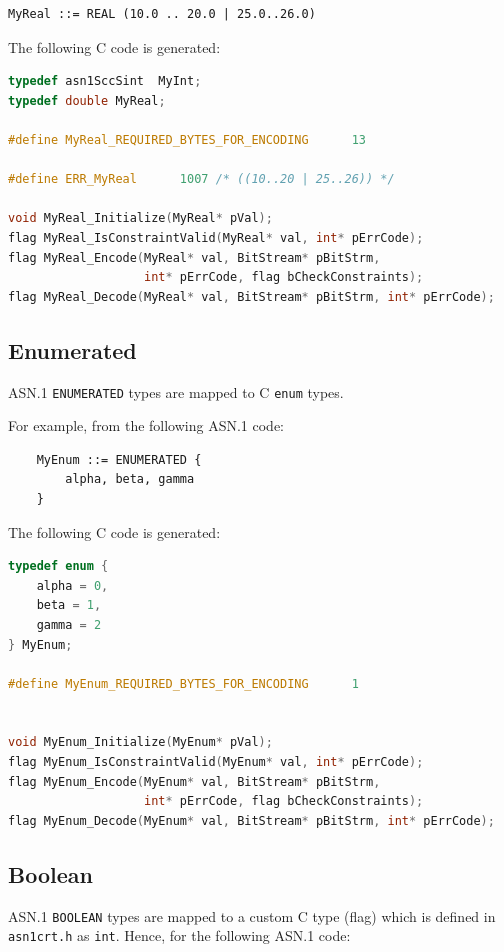 \documentclass[11pt]{book}
\begin{document}
\begin{lstlisting}
MyReal ::= REAL (10.0 .. 20.0 | 25.0..26.0)
\end{lstlisting}

      The following C code is generated:

\begin{lstlisting}[language=c]
typedef asn1SccSint  MyInt;
typedef double MyReal;

#define MyReal_REQUIRED_BYTES_FOR_ENCODING		13

#define ERR_MyReal		1007 /* ((10..20 | 25..26)) */

void MyReal_Initialize(MyReal* pVal);
flag MyReal_IsConstraintValid(MyReal* val, int* pErrCode);
flag MyReal_Encode(MyReal* val, BitStream* pBitStrm, 
                   int* pErrCode, flag bCheckConstraints);
flag MyReal_Decode(MyReal* val, BitStream* pBitStrm, int* pErrCode);
\end{lstlisting}


      \subsection{Enumerated}
      ASN.1 \texttt{ENUMERATED} types are mapped to C \texttt{enum} types.

      For example, from the following ASN.1 code:

\begin{lstlisting}
	MyEnum ::= ENUMERATED {
		alpha, beta, gamma
	}
\end{lstlisting}

      The following C code is generated:

\begin{lstlisting}[language=c]
typedef enum {
    alpha = 0,
    beta = 1,
    gamma = 2
} MyEnum;

#define MyEnum_REQUIRED_BYTES_FOR_ENCODING		1


void MyEnum_Initialize(MyEnum* pVal);
flag MyEnum_IsConstraintValid(MyEnum* val, int* pErrCode);
flag MyEnum_Encode(MyEnum* val, BitStream* pBitStrm, 
                   int* pErrCode, flag bCheckConstraints);
flag MyEnum_Decode(MyEnum* val, BitStream* pBitStrm, int* pErrCode);
\end{lstlisting}

      \subsection{Boolean}
      ASN.1 \texttt{BOOLEAN} types are mapped to a custom C type (flag) which is 
      defined in \texttt{asn1crt.h} as \texttt{int}.
      Hence, for the following ASN.1 code:
\end{document}

